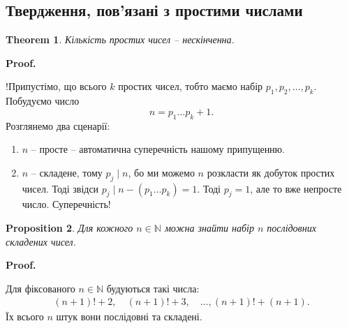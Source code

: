 \documentclass[a4paper, 10pt]{article}
\makeatletter
\theoremstyle{theoremdd}
\newtheorem{theorem}{Theorem}[subsection]
\theoremstyle{theoremdd}
\theoremstyle{theoremdd}
\theoremstyle{theoremdd}
\theoremstyle{theoremdd}
\newtheorem{proposition}[theorem]{Proposition}
\theoremstyle{theoremdd}
\theoremstyle{theoremdd}
\theoremstyle{theoremdd}
\renewenvironment{proof}[1][Proof.\\]{\par
\pushQED{\hfill \qed}%
\normalfont \topsep6\p@\@plus6\p@\relax
\trivlist
\item\relax
{\bfseries
#1\@addpunct{.}}\hspace\labelsep\ignorespaces
}{%
\popQED\endtrivlist\@endpefalse
}
\makeatother
\begin{document}
\subsection{Твердження, пов'язані з простими числами}
\begin{theorem}
Кількість простих чисел -- нескінченна.
\end{theorem}

\begin{proof}
!Припустімо, що всього $k$ простих чисел, тобто маємо набір $p_1,p_2,\dots,p_k$. Побудуємо число \[
n = p_1 \dots p_k + 1.
\]
Розглянемо два сценарії:
\begin{enumerate}[nosep,wide=0pt,label={\arabic*)}]
\item $n$ -- просте -- автоматична суперечність нашому припущенню.
\item $n$ -- складене, тому $p_j \mid n$, бо ми можемо $n$ розкласти як добуток простих чисел. Тоді звідси $p_j \mid n - (p_1\dots p_k) = 1$. Тоді $p_j = 1$, але то вже непросте число. Суперечність! \qedhere
\end{enumerate}
\end{proof}

\begin{proposition}
Для кожного $n \in \mathbb{N}$ можна знайти набір $n$ послідовних складених чисел.
\end{proposition}

\begin{proof}
Для фіксованого $n \in \mathbb{N}$ будуються такі числа:
\begin{align*}
(n+1)! + 2, \quad (n+1)! + 3, \quad \dots, (n+1)! + (n+1).
\end{align*}
Їх всього $n$ штук вони послідовні та складені.
\end{proof}
\end{document}
